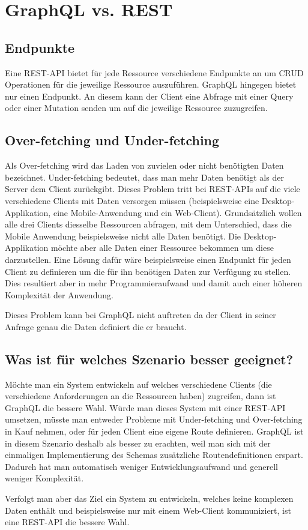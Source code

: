 \section{GraphQL vs. REST}
\subsection{Endpunkte}
Eine REST-API bietet für jede Ressource verschiedene Endpunkte an um CRUD Operationen für die jeweilige Ressource auszuführen. GraphQL hingegen bietet nur einen
Endpunkt. An diesem kann der Client eine Abfrage mit einer Query oder einer Mutation senden um auf die jeweilige Ressource zuzugreifen.

\subsection{Over-fetching und Under-fetching}
Als Over-fetching wird das Laden von zuvielen oder nicht benötigten Daten bezeichnet.
Under-fetching bedeutet, dass man mehr Daten benötigt als der Server dem Client zurückgibt. Dieses Problem tritt bei REST-APIs auf die viele verschiedene Clients mit Daten versorgen müssen (beispielsweise eine Desktop-Applikation, eine Mobile-Anwendung
und ein Web-Client). Grundsätzlich wollen alle drei Clients diesselbe Ressourcen abfragen, mit dem Unterschied, dass die Mobile Anwendung beispielsweise nicht alle Daten
benötigt. Die Desktop-Applikation möchte aber alle Daten einer Ressource bekommen
um diese darzustellen. Eine Lösung dafür wäre beispielsweise einen Endpunkt für jeden
Client zu definieren um die für ihn benötigen Daten zur Verfügung zu stellen. Dies resultiert aber in mehr Programmieraufwand und damit auch einer höheren Komplexität
der Anwendung.
\newline

Dieses Problem kann bei GraphQL nicht auftreten da der Client in seiner Anfrage genau die Daten definiert die er braucht.

\subsection{Was ist für welches Szenario besser geeignet?}
Möchte man ein System entwickeln auf welches verschiedene Clients (die verschiedene Anforderungen an die Ressourcen haben) zugreifen, dann ist GraphQL die bessere
Wahl. Würde man dieses System mit einer REST-API umsetzen, müsste man entweder
Probleme mit Under-fetching und Over-fetching in Kauf nehmen, oder für jeden Client eine eigene Route definieren. GraphQL ist in diesem Szenario deshalb als besser zu
erachten, weil man sich mit der einmaligen Implementierung des Schemas zusätzliche
Routendefinitionen erspart. Dadurch hat man automatisch weniger Entwicklungsaufwand und generell weniger Komplexität.
\newline


Verfolgt man aber das Ziel ein System zu entwickeln, welches keine komplexen Daten enthält und beispielsweise nur mit einem Web-Client kommuniziert, ist eine REST-API die bessere Wahl.
